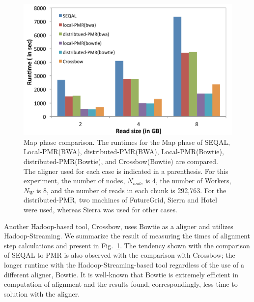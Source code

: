 \documentclass{acm_proc_article-sp}
\begin{document}
\begin{figure} 
 \centering
\includegraphics[scale=0.40]{figures/map_comp.pdf}
\caption{\small  Map phase comparison.  The runtimes for the Map phase of SEQAL, Local-PMR(BWA), distributed-PMR(BWA), Local-PMR(Bowtie), distributed-PMR(Bowtie), and Crossbow(Bowtie) are compared.  The aligner used for each case is indicated in a parenthesis.  For this experiment, the number of nodes, $N_{node}$ is 4, the number of Workers, $N_W$ is 8, and the number of reads in each chunk is 292,763.  For the distributed-PMR, two machines of FutureGrid, Sierra and Hotel were used, whereas Sierra was used for other cases.}
  \label{fig:tool_comp} 
\end{figure}


Another Hadoop-based tool, Crossbow, uses Bowtie as a aligner and
utilizes Hadoop-Streaming\cite{hadoop-url}.  We summarize the result
of measuring the times of alignment step calculations and present in
Fig.~\ref{fig:tool_comp}.  The tendency shown with the comparison of
SEQAL to PMR is also observed with the comparison with Crossbow; the
longer runtime with the Hadoop-Streaming-based tool regardless of the
use of a different aligner, Bowtie.  It is well-known that Bowtie is
extremely efficient in computation of alignment and the results found,
correspondingly, less time-to-solution with the aligner.
\end{document}
